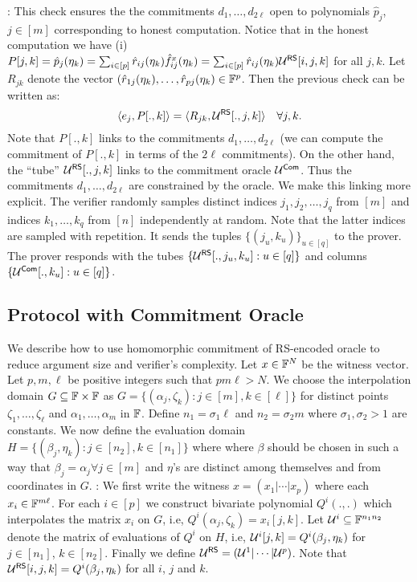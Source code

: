 : This check ensures
the the commitments $d_1,\ldots,d_{2\ell}$ open to polynomials $\hat{p}_j$,
$j\in [m]$ corresponding to honest computation. Notice that in the honest
computation we have (i) $P[j,k]=\hat{p}_j(\eta_k)=\sum_{i\in
[p]}\hat{r}_{ij}(\eta_k)\hat{f}^x_{ij}(\eta_k)=\sum_{i\in[p]}\hat{r}_{ij}(\eta_k)\mathcal{U}^{\mathsf{RS}}[i,j,k]$
for all $j,k$. Let $R_{jk}$ denote the vector
$(\hat{r}_{1j}(\eta_k),\ldots,\hat{r}_{pj}(\eta_k)\in \mathbb{F}^p$. Then the previous
check can be written as:
\begin{equation}
\langle e_j,P[.,k]\rangle = \langle R_{jk},\mathcal{U}^{\mathsf{RS}}[.,j,k]\rangle \quad \forall j,k.
\end{equation}
Note that $P[.,k]$ links to the commitments $d_1,\ldots,d_{2\ell}$ (we can
compute the commitment of $P[.,k]$ in terms of the $2\ell$ commitments). On the
other hand, the ``tube'' $\mathcal{U}^{\mathsf{RS}}[.,j,k]$ links to the commitment oracle
$\mathcal{U}^{\mathsf{Com}}$. Thus the commitments $d_1,\ldots,d_{2\ell}$ are constrained by
the oracle. We make this linking more explicit. The verifier randomly samples
distinct indices $j_1,j_2,\ldots,j_q$ from $[m]$ and indices $k_1,\ldots,k_q$
from $[n]$ independently at random. Note that the latter indices are sampled
with repetition. It sends the tuples $\{(j_u,k_u)\}_{u\in [q]}$ to the prover. The prover responds with the tubes
$\{\mathcal{U}^{\mathsf{RS}}[.,j_u,k_u]:u\in [q]\}$ and columns $\{\mathcal{U}^{\mathsf{Com}}[.,k_u]:u\in
[q]\}$. 
  

\subsection{Protocol with Commitment Oracle}
We describe how to use homomorphic commitment of RS-encoded oracle to reduce
argument size and verifier's complexity. Let $x\in \mathbb{F}^N$ be the witness
vector. Let $p,m,\ell$ be positive integers such that $pm\ell > N$. We choose the interpolation domain $G\subseteq \mathbb{F}\times \mathbb{F}$ as
$G=\{(\alpha_j,\zeta_k): j\in [m], k\in [\ell]\}$ for distinct points
$\zeta_1,\ldots,\zeta_\ell$ and $\alpha_1,\ldots,\alpha_m$ in $\mathbb{F}$. Define $n_1=\sigma_1\ell$ and
$n_2=\sigma_2 m$ where $\sigma_1,\sigma_2 > 1$ are constants. We now define the
evaluation domain $H=\{(\beta_j,\eta_k): j\in [n_2],k\in
[n_1]\}$ where %
where $\beta$ should be chosen in such a way that $\beta_j=\alpha_j \forall j\in[m]$ and $\eta$'s are distinct among themselves and from
coordinates in $G$.\smallskip
{}
:
We first write the witness $x=(x_1|\cdots|x_p)$ where each $x_i\in
\mathbb{F}^{m\ell}$.
For each $i\in [p]$ we construct bivariate polynomial $Q^i(.,.)$ which
interpolates the matrix $x_i$ on $G$, i.e, $Q^i(\alpha_j,\zeta_k)=x_i[j,k]$.
Let $\mathcal{U}^i\subseteq \mathbb{F}^{n_1n_2}$ denote the matrix of evaluations of $Q^i$
on $H$, i.e, $\mathcal{U}^i[j,k]=Q^i(\beta_j,\eta_k)$ for $j\in [n_1]$, $k\in
[n_2]$. Finally we define $\mathcal{U}^{\mathsf{RS}}=(\mathcal{U}^1|\cdots|\mathcal{U}^p)$. Note that
$\mathcal{U}^{\mathsf{RS}}[i,j,k]=Q^i(\beta_j,\eta_k)$ for all $i$, $j$ and $k$.\smallskip

